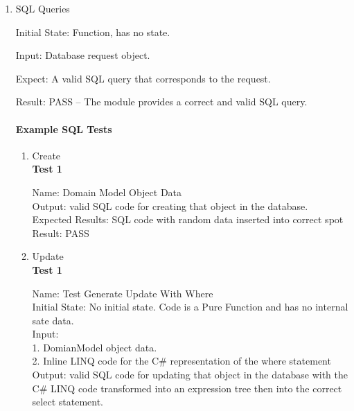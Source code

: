 \documentclass[12pt, titlepage]{article}
\begin{document}
    \begin{enumerate}

      \item{SQL Queries\\} \label{sql}

      Initial State: Function, has no state.

      Input: Database request object.

      Expect: A valid SQL query that corresponds to the request.
                
			Result: PASS -- The module provides a correct and valid SQL query.

			\paragraph{Example SQL Tests}
			\begin{enumerate}
				\item Create\\

				{\bf Test 1\\}

				Name: Domain Model Object Data\\

				Output: valid SQL code for creating that object in the database.\\

				Expected Results: SQL code with random data inserted into correct spot\\

				Result: PASS\\

				\item Update\\

				{\bf Test 1\\}

				Name: Test Generate Update With Where\\

				Initial State: No initial state. Code is a Pure Function and has no internal sate data.\\

				Input:\\
				1. DomianModel object data.\\
				2. Inline LINQ code for the C\# representation of the where statement\\

				Output: valid SQL code for updating that object in the database with
				the C\# LINQ code transformed into an expression tree then into the correct
				select statement.\\


\end{enumerate}
\end{enumerate}
\end{document}
